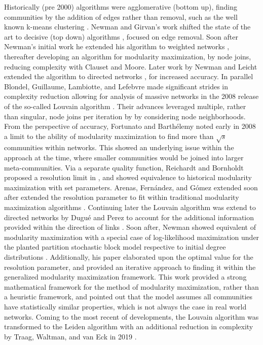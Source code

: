 \documentclass[a4paper, 10pt, twocolumn]{article}
\begin{document}
Historically (pre 2000) algorithms were agglomerative (bottom up), finding communities by the addition of edges rather than removal, such as the well known k-means clustering \cite{least_squares_PCM, some_methods}. 
Newman and Girvan's work shifted the state of the art to decisive (top down) algorithms \cite{com_struct_in_soc_and_bio}, focused on edge removal. 
Soon after Newman's initial work he extended his algorithm to weighted networks \cite{analysis_of_wnets}, thereafter developing an algorithm for modularity maximization, by node joins, reducing complexity \cite{finding_comm_struct} with Clauset and Moore.
Later work by Newman and Leicht extended the algorithm to directed networks \cite{com_struct_indir}, for increased accuracy. 
In parallel Blondel, Guillaume, Lambiotte, and Lefebvre made significant strides in complexity reduction allowing for analysis of massive networks in the 2008 release of the so-called Louvain algorithm \cite{louvain}. 
Their advances leveraged multiple, rather than singular, node joins per iteration by by considering node neighborhoods.
From the perspective of accuracy, Fortunato and Barth{\'{e}}lemy noted early in 2008 a limit to the ability of modularity maximization to find more than $ \sqrt{s} $ communities within networks. 
This showed an underlying issue within the approach at the time, where smaller communities would be joined into larger meta-communities. 
Via a separate quality function, Reichardt and Bornholdt proposed a resolution limit in \cite{statistical_mechanics}, and showed equivalence to historical modularity maximization with set parameters. 
Arenas, Fern{\'{a}}ndez, and G{\'{o}}mez extended soon after extended the resolution parameter to fit within traditional modularity maximization algorithms \cite{different_resolution_levels}. 
Continuing later the Louvain algorithm was extend to directed networks by Dugu{\'{e}} and Perez to account for the additional information provided within the direction of links \cite{directed_louvain}. 
Soon after, Newman showed equivalent of modularity maximization with a special case of log-likelihood maximization under the planted partition stochastic block model respective to initial degree distributions \cite{equivalence_between}. 
Additionally, his paper elaborated upon the optimal value for the resolution parameter, and provided an iterative approach to finding it within the generalized modularity maximization framework. 
This work provided a strong mathematical framework for the method of modularity maximization, rather than a heuristic framework, and pointed out that the model assumes all communities have statistically similar properties, which is not always the case in real world networks.  
Coming to the most recent of developments, the Louvain algorithm was transformed to the Leiden algorithm with an additional reduction in complexity by Traag, Waltman, and van Eck in 2019 \cite{louvain_2_leiden}. 
\end{document}
